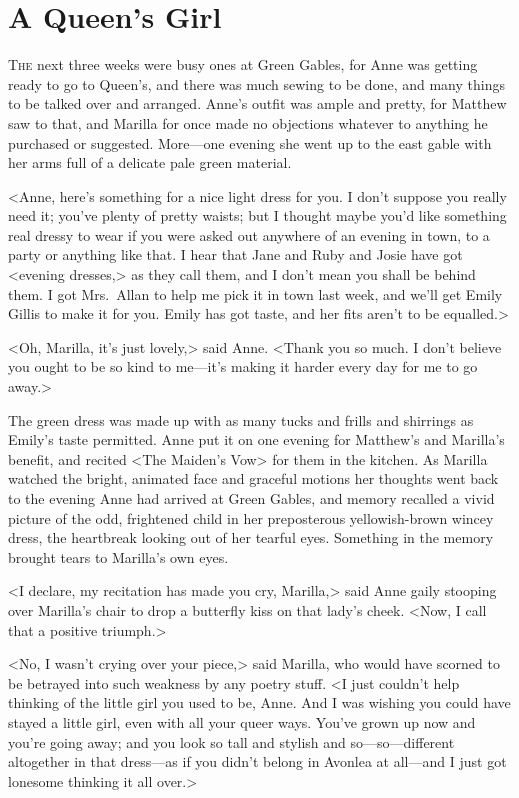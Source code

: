 \chapter{A Queen's Girl}

\lettrine{T}{he} next three weeks were busy ones at Green Gables, for Anne was getting ready to go to Queen's, and there was much sewing to be done, and many things to be talked over and arranged. Anne's outfit was ample and pretty, for Matthew saw to that, and Marilla for once made no objections whatever to anything he purchased or suggested. More—one evening she went up to the east gable with her arms full of a delicate pale green material.

<Anne, here's something for a nice light dress for you. I don't suppose you really need it; you've plenty of pretty waists; but I thought maybe you'd like something real dressy to wear if you were asked out anywhere of an evening in town, to a party or anything like that. I hear that Jane and Ruby and Josie have got <evening dresses,> as they call them, and I don't mean you shall be behind them. I got Mrs.~Allan to help me pick it in town last week, and we'll get Emily Gillis to make it for you. Emily has got taste, and her fits aren't to be equalled.>

<Oh, Marilla, it's just lovely,> said Anne. <Thank you so much. I don't believe you ought to be so kind to me—it's making it harder every day for me to go away.>

The green dress was made up with as many tucks and frills and shirrings as Emily's taste permitted. Anne put it on one evening for Matthew's and Marilla's benefit, and recited <The Maiden's Vow> for them in the kitchen. As Marilla watched the bright, animated face and graceful motions her thoughts went back to the evening Anne had arrived at Green Gables, and memory recalled a vivid picture of the odd, frightened child in her preposterous yellowish-brown wincey dress, the heartbreak looking out of her tearful eyes. Something in the memory brought tears to Marilla's own eyes.

<I declare, my recitation has made you cry, Marilla,> said Anne gaily stooping over Marilla's chair to drop a butterfly kiss on that lady's cheek. <Now, I call that a positive triumph.>

<No, I wasn't crying over your piece,> said Marilla, who would have scorned to be betrayed into such weakness by any poetry stuff. <I just couldn't help thinking of the little girl you used to be, Anne. And I was wishing you could have stayed a little girl, even with all your queer ways. You've grown up now and you're going away; and you look so tall and stylish and so—so—different altogether in that dress—as if you didn't belong in Avonlea at all—and I just got lonesome thinking it all over.>

